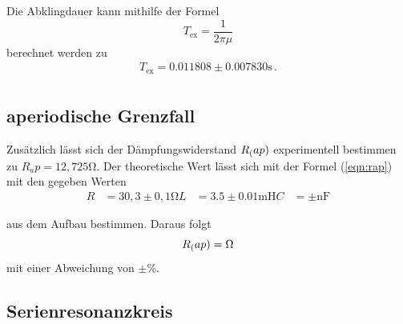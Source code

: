 \noindent
Die Abklingdauer kann mithilfe der Formel 
\begin{equation*}
    T_\text{ex} = \frac{1}{2\pi\mu} 
\end{equation*}
berechnet werden zu
\begin{align*}
    T_\text{ex} = 0.011808 \pm 0.007830 \si{\second} \, . \\
\end{align*}



\subsection{aperiodische Grenzfall}
Zusätzlich lässt sich der Dämpfungswiderstand $R_\text(ap)$ experimentell bestimmen zu $R_ap = 12,725 \si{\ohm}$. Der theoretische Wert lässt sich mit der Formel (\ref{eqn:rap}) %
mit den gegeben Werten
\begin{align*}
   R &= 30,3 \pm 0,1 \si{\ohm}
   L &= 3.5 \pm 0.01 \si{\milli\henry}
   C &= \pm \si{\nano\farad}    
\end{align*}

\noindent
aus dem Aufbau bestimmen. Daraus folgt $$ R_\text(ap) = \si{\ohm} $$ mit einer Abweichung von $ \pm \si{\percent}$.

\subsection{Serienresonanzkreis}
